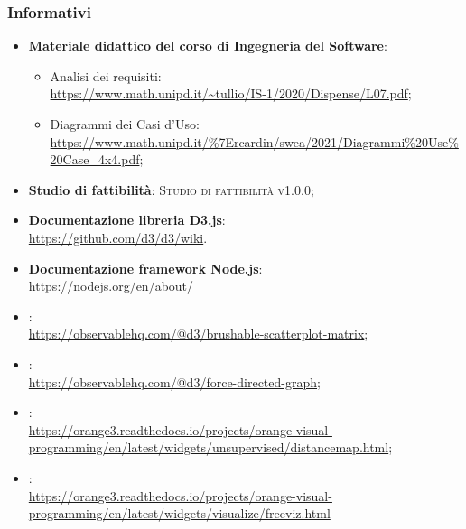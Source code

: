 \documentclass[../analisi_dei_requisiti.tex]{subfiles}
\begin{document}
\subsubsection{Informativi}%
\label{ssub:informativi}
\begin{itemize}
  \item \textbf{Materiale didattico del corso di Ingegneria del Software}:
  \begin{itemize}
    \item Analisi dei requisiti: \\
    \url{https://www.math.unipd.it/~tullio/IS-1/2020/Dispense/L07.pdf};
    \item Diagrammi dei Casi d'Uso: \\
    \url{https://www.math.unipd.it/%7Ercardin/swea/2021/Diagrammi%20Use%20Case_4x4.pdf};
  \end{itemize}
  \item \textbf{Studio di fattibilità}: \textsc{Studio di fattibilità v1.0.0};
  
  \item \textbf{Documentazione libreria D3.js}: \\
  \url{https://github.com/d3/d3/wiki}.

  \item \textbf{Documentazione framework Node.js}: \\
  \url{https://nodejs.org/en/about/}

  \item {}: \\ 
  \url{https://observablehq.com/@d3/brushable-scatterplot-matrix};
        
  \item {}: \\  
  \url{https://observablehq.com/@d3/force-directed-graph};

  \item {}: \\ 
  \url{https://orange3.readthedocs.io/projects/orange-visual-programming/en/latest/widgets/unsupervised/distancemap.html}; 
        
  \item {}: \\ 
  \url{https://orange3.readthedocs.io/projects/orange-visual-programming/en/latest/widgets/visualize/freeviz.html}
\end{itemize}
\end{document}
